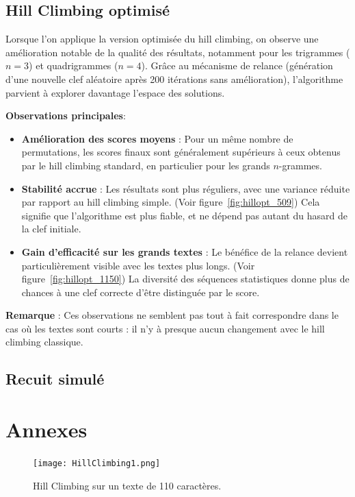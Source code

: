 \documentclass[a4paper]{article}
\begin{document}
\subsection{Hill Climbing optimisé}

Lorsque l’on applique la version optimisée du hill climbing, on observe une amélioration notable de la qualité des résultats, notamment pour les trigrammes ($n=3$) et quadrigrammes ($n=4$). Grâce au mécanisme de relance (génération d’une nouvelle clef aléatoire après 200 itérations sans amélioration), l’algorithme parvient à explorer davantage l’espace des solutions.

\textbf{Observations principales}:
\begin{itemize}
    \item \textbf{Amélioration des scores moyens} : Pour un même nombre de permutations, les scores finaux sont généralement supérieurs à ceux obtenus par le hill climbing standard, en particulier pour les grands $n$-grammes.
    
    \item \textbf{Stabilité accrue} : Les résultats sont plus réguliers, avec une variance réduite par rapport au hill climbing simple. (Voir figure~\ref{fig:hillopt_509}) Cela signifie que l’algorithme est plus fiable, et ne dépend pas autant du hasard de la clef initiale.
    
    \item \textbf{Gain d’efficacité sur les grands textes} : Le bénéfice de la relance devient particulièrement visible avec les textes plus longs. (Voir figure~\ref{fig:hillopt_1150}) La diversité des séquences statistiques donne plus de chances à une clef correcte d’être distinguée par le score.
\end{itemize}

\textbf{Remarque} : Ces observations ne semblent pas tout à fait correspondre dans le cas où les textes sont courts : il n'y à presque aucun changement avec le hill climbing classique.

\subsection{Recuit simulé}

\clearpage
\appendix
\section*{Annexes}
\label{sec:annexes}

\begin{figure}[H]
    \centering
    \texttt{[image: HillClimbing1.png]}
    \caption{Hill Climbing sur un texte de 110 caractères.}
    \label{fig:hill_110}
\end{figure}
\end{document}
